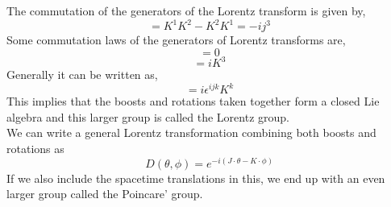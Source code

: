 The commutation of the generators of the Lorentz transform is given by, 
\begin{equation}
    [K^{1}, K^{2}] = K^{1}K^{2} - K^{2}K^{1} = -ij^{3}
\end{equation}
Some commutation laws of the generators of Lorentz transforms are, 
\begin{equation}
    [J^{1},K^{1}] = 0
\end{equation}
\begin{equation}
    [J^{1}, K^{2}] = iK^{3}
\end{equation}
Generally it can be written as, 
\begin{equation}
    [J^{i}, K^{j}] = i \epsilon^{ijk}K^{k}
\end{equation}
This implies that the boosts and rotations taken together form a closed Lie
algebra and this larger group is called the Lorentz group. \\
We can write a general Lorentz transformation combining both boosts and rotations as
\begin{equation}
    D(\theta, \phi) = e^{-i(J\cdot \theta - K \cdot \phi)}
\end{equation}
If we also include the spacetime translations in this, we end up with an even larger group called the Poincare' group.